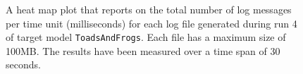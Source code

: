\begin{figure}[htbp]
\centering
\begin{minipage}{1\textwidth}
  \centering
\end{minipage}
\caption{A heat map plot that reports on the total number of log messages per time unit (milliseconds) for each log file generated during run 4 of target model \texttt{ToadsAndFrogs}. Each file has a maximum size of 100MB. The results have been measured over a time span of 30 seconds.}
\label{figure:throughput_sum_toadsandfrogs_4}
\end{figure}